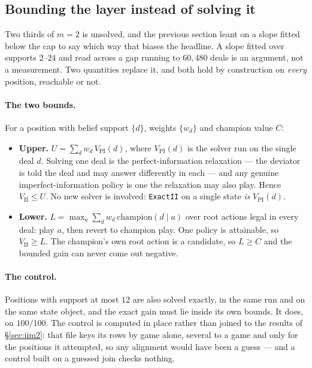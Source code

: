 \documentclass[11pt,a4paper]{article}
\begin{document}
\subsection{Bounding the layer instead of solving it}
\label{sec:iibounds}

Two thirds of $m = 2$ is unsolved, and the previous section leant on a slope
fitted below the cap to say which way that biases the headline. A slope
fitted over supports $2$--$24$ and read across a gap running to $60{,}480$
deals is an argument, not a measurement. Two quantities replace it, and both
hold by construction on \emph{every} position, reachable or not.

\paragraph{The two bounds.} For a position with belief support $\{d\}$,
weights $\{w_d\}$ and champion value $C$:

\begin{itemize}
\item \textbf{Upper.} $U = \sum_d w_d\,V_{\mathrm{PI}}(d)$, where
  $V_{\mathrm{PI}}(d)$ is the solver run on the single deal $d$. Solving one
  deal is the perfect-information relaxation --- the deviator is told the deal
  and may answer differently in each --- and any genuine
  imperfect-information policy is one the relaxation may also play. Hence
  $V_{\mathrm{II}} \le U$. No new solver is involved: \texttt{ExactII} on a
  single state \emph{is} $V_{\mathrm{PI}}(d)$.
\item \textbf{Lower.} $L = \max_a \sum_d w_d\,\mathrm{champion}(d \mid a)$
  over root actions legal in every deal: play $a$, then revert to champion
  play. One policy is attainable, so $V_{\mathrm{II}} \ge L$. The champion's
  own root action is a candidate, so $L \ge C$ and the bounded gain can never
  come out negative.
\end{itemize}

\paragraph{The control.} Positions with support at most $12$ are also solved
exactly, in the same run and on the same state object, and the exact gain must
lie inside its own bounds. It does, on \textbf{$100/100$}. The control is
computed in place rather than joined to the results of \S\ref{sec:iim2}: that
file keys its rows by game alone, several to a game and only for the positions
it attempted, so any alignment would have been a guess --- and a control built
on a guessed join checks nothing.
\end{document}
